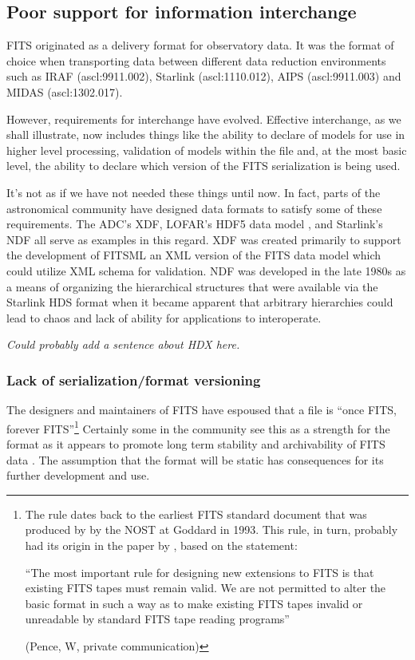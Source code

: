 \documentclass[final,authoryear,5p,times,twocolumn]{elsarticle}
\begin{document}
\subsection{Poor support for information interchange}

FITS originated as a delivery format for observatory data. It was the
format of choice when transporting data between different data
reduction environments such as IRAF (ascl:9911.002), Starlink
(ascl:1110.012), AIPS (ascl:9911.003) and MIDAS (ascl:1302.017).


However, requirements for interchange have evolved. Effective
interchange, as we shall illustrate, now includes things like the
ability to declare of models for use in higher level processing,
validation of models within the file and, at the most basic level, the
ability to declare which version of the FITS serialization is being
used.


It's not as if we have not needed these things until now. In fact,
parts of the astronomical community have designed data formats to
satisfy some of these requirements. The ADC's XDF, LOFAR's HDF5 data
model \citep{2012ASPC..461..283A}, and Starlink's NDF
\citep{1988STARB...2...11C,1993ASPC...52..229W,P91_adassxxiii} all
serve as examples in this regard. XDF was created primarily to support
the development of FITSML an XML version of the FITS data model which
could utilize XML schema for validation. NDF was developed in the late
1980s as a means of organizing the hierarchical structures that were
available via the Starlink HDS format when it became apparent that
arbitrary hierarchies could lead to chaos and lack of ability for
applications to interoperate.

\textit{Could probably add a sentence about HDX here.}

\subsubsection{Lack of serialization/format versioning}


The designers and maintainers of FITS have espoused that a file is
``once FITS, forever FITS''\footnote{The rule dates back to the earliest
FITS standard document that was produced by by the NOST at Goddard in
1993. This rule, in turn, probably had its origin in the paper by
\citet{1988A&AS...73..359G}, based on the statement:

``The most important rule for designing new extensions to FITS is that
existing FITS tapes must remain valid.  We are not permitted to alter
the basic format in such a way as to make existing FITS tapes invalid
or unreadable by standard FITS tape reading programs''

(Pence, W, private communication)}
Certainly some in the community see
this as a strength for the format as it appears to promote long term
stability and archivability of FITS data \citep[][US Library
of Congress\footnote{see \url{http://www.digitalpreservation.gov/formats/fdd/fdd000317.shtml}}]{2012EWASSAlle}.
The assumption that the format will be static has
consequences for its further development and use.
\end{document}
